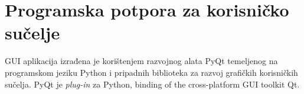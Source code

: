 \chapter{Programska potpora za korisničko sučelje}

GUI aplikacija izrađena je korištenjem razvojnog alata PyQt temeljenog na programskom
jeziku Python i pripadnih biblioteka za razvoj grafičkih korisničkih sučelja. PyQt je \textit{plug-in} za Python, binding of the cross-platform GUI toolkit Qt.